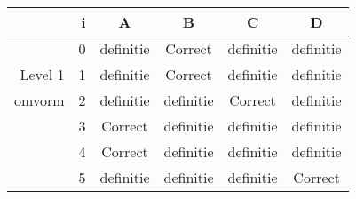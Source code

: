\begin{tabular}{ rr| c|c|c|c}\hline\hline
     & i & \textbf{A} & \textbf{B} & \textbf{C} & \textbf{D}\\\hline

&0&definitie&Correct\cellcolor[gray]{0.6}&definitie&definitie\\
Level 1 & 1&definitie&Correct\cellcolor[gray]{0.6}&definitie&definitie\\
omvorm &2&definitie&definitie&Correct\cellcolor[gray]{0.6}&definitie\\
&3&Correct\cellcolor[gray]{0.6}&definitie&definitie&definitie\\
&4&Correct\cellcolor[gray]{0.6}&definitie&definitie&definitie\\
&5&definitie&definitie&definitie&Correct\cellcolor[gray]{0.6}\\
\hline\end{tabular}\par\ \newline

